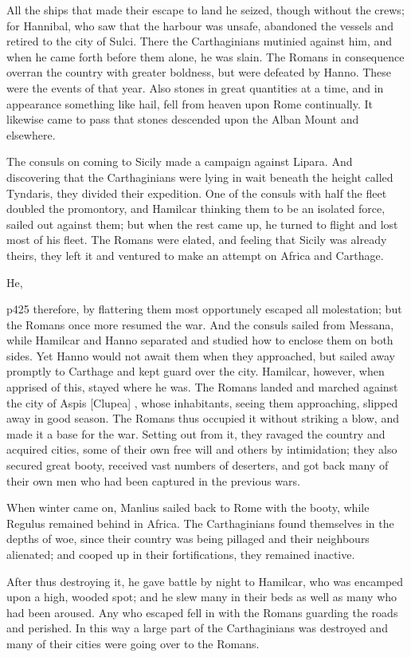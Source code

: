All the ships that made their escape to land he seized, though without the crews; for Hannibal, who saw that the harbour was unsafe, abandoned the vessels and retired to the city of Sulci. There the Carthaginians mutinied against him, and when he came forth before them alone, he was slain. The Romans in consequence overran the country with greater boldness, but were defeated by Hanno. These were the events of that year. Also stones in great quantities at a time, and in appearance something like hail, fell from heaven upon Rome continually. It likewise came to pass that stones descended upon the Alban Mount and elsewhere.

The consuls on coming to Sicily made a campaign against Lipara. And discovering that the Carthaginians were lying in wait beneath the height called Tyndaris, they divided their expedition. One of the consuls with half the fleet doubled the promontory, and Hamilcar thinking them to be an isolated force, sailed out against them; but when the rest came up, he turned to flight and lost most of his fleet. The Romans were elated, and feeling that Sicily was already theirs, they left it and ventured to make an attempt on Africa and Carthage.

He,

p425 therefore, by flattering them most opportunely escaped all molestation; but the Romans once more resumed the war. And the consuls sailed from Messana, while Hamilcar and Hanno separated and studied how to enclose them on both sides. Yet Hanno would not await them when they approached, but sailed away promptly to Carthage and kept guard over the city. Hamilcar, however, when apprised of this, stayed where he was. The Romans landed and marched against the city of Aspis [Clupea] , whose inhabitants, seeing them approaching, slipped away in good season. The Romans thus occupied it without striking a blow, and made it a base for the war. Setting out from it, they ravaged the country and acquired cities, some of their own free will and others by intimidation; they also secured great booty, received vast numbers of deserters, and got back many of their own men who had been captured in the previous wars.

When winter came on, Manlius sailed back to Rome with the booty, while Regulus remained behind in Africa. The Carthaginians found themselves in the depths of woe, since their country was being pillaged and their neighbours alienated; and cooped up in their fortifications, they remained inactive.

After thus destroying it, he gave battle by night to Hamilcar, who was encamped upon a high, wooded spot; and he slew many in their beds as well as many who had been aroused. Any who escaped fell in with the Romans guarding the roads and perished. In this way a large part of the Carthaginians was destroyed and many of their cities were going over to the Romans.

